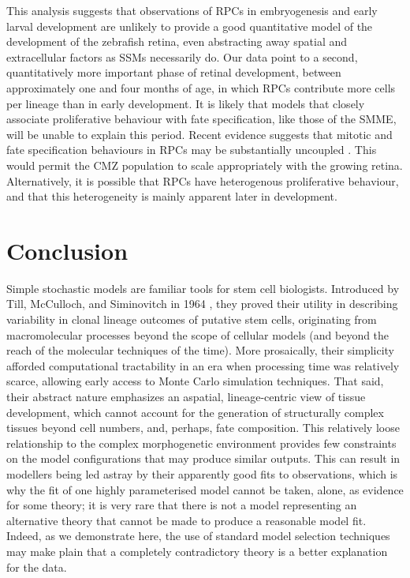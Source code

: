 \documentclass{ut-thesis}
\begin{document}
\begin{NoHyper}
This analysis suggests that observations of RPCs in embryogenesis and early larval development are unlikely to provide a good quantitative model of the development of the zebrafish retina, even abstracting away spatial and extracellular factors as SSMs necessarily do. Our data point to a second, quantitatively more important phase of retinal development, between approximately one and four months of age, in which RPCs contribute more cells per lineage than in early development. It is likely that models that closely associate proliferative behaviour with fate specification, like those of the SMME, will be unable to explain this period. Recent evidence suggests that mitotic and fate specification behaviours in RPCs may be substantially uncoupled \cite{Engerer2017}. This would permit the CMZ population to scale appropriately with the growing retina. Alternatively, it is possible that RPCs have heterogenous proliferative behaviour, and that this heterogeneity is mainly apparent later in development.

\section{Conclusion}

Simple stochastic models are familiar tools for stem cell biologists. Introduced by Till, McCulloch, and Siminovitch in 1964 \cite{Till1964}, they proved their utility in describing variability in clonal lineage outcomes of putative stem cells, originating from macromolecular processes beyond the scope of cellular models (and beyond the reach of the molecular techniques of the time). More prosaically, their simplicity afforded computational tractability in an era when processing time was relatively scarce, allowing early access to Monte Carlo simulation techniques. That said, their abstract nature emphasizes an aspatial, lineage-centric view of tissue development, which cannot account for the generation of structurally complex tissues beyond cell numbers, and, perhaps, fate composition. This relatively loose relationship to the complex morphogenetic environment provides few constraints on the model configurations that may produce similar outputs. This can result in modellers being led astray by their apparently good fits to observations, which is why the fit of one highly parameterised model cannot be taken, alone, as evidence for some theory; it is very rare that there is not a model representing an alternative theory that cannot be made to produce a reasonable model fit. Indeed, as we demonstrate here, the use of standard model selection techniques may make plain that a completely contradictory theory is a better explanation for the data.


\end{NoHyper}
\end{document}

